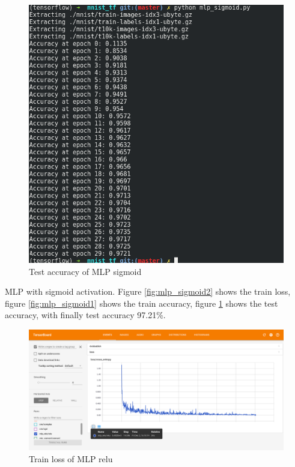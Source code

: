 \documentclass[10pt,twocolumn,letterpaper]{article}
\begin{document}
\begin{CJK}{UTF8}{gbsn}
\begin{figure}
\begin{center}
   \includegraphics[width=0.9\linewidth]{mlp_sigmoid3.png}
\end{center}
\caption{Test accuracy of MLP sigmoid}
\label{fig:mlp_sigmoid3}
\end{figure}

MLP with sigmoid activation. Figure \ref{fig:mlp_sigmoid2} shows the train loss, figure \ref{fig:mlp_sigmoid1} shows the train accuracy, figure \ref{fig:mlp_sigmoid3} shows the test accuracy, with finally test accuracy 97.21\%. 

\begin{figure}
\begin{center}
   \includegraphics[width=0.9\linewidth]{mlp_relu2.png}
\end{center}
\caption{Train loss of MLP relu}
\label{fig:mlp_relu2}
\end{figure}


\end{CJK}
\end{document}
